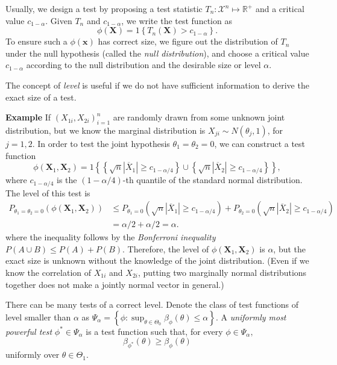 \documentclass[11pt]{article}
\begin{document}
\bigskip 

    Usually, we design a test by proposing a test statistic
\(T_{n}:\mathcal{X}^{n}\mapsto\mathbb{R}^{+}\) and a critical value
\(c_{1-\alpha}\). Given \(T_n\) and \(c_{1-\alpha}\), we write the test
function as
\[\phi\left(\mathbf{X}\right)=1\left\{ T_{n}\left(\mathbf{X}\right)>c_{1-\alpha}\right\}.\]
To ensure such a \(\phi\left(\mathbf{x}\right)\) has correct size, we
figure out the distribution of \(T_{n}\) under the null hypothesis
(called the \emph{null distribution}), and choose a critical value
\(c_{1-\alpha}\) according to the null distribution and the desirable
size or level \(\alpha\).

The concept of \emph{level} is useful if we do not have sufficient information to
derive the exact size of a test.

\bigskip

\textbf{Example} If \(\left(X_{1i},X_{2i}\right)_{i=1}^{n}\) are
randomly drawn from some unknown joint distribution, but we know the
marginal distribution is \(X_{ji}\sim N\left(\theta_{j},1\right)\), for
\(j=1,2\). In order to test the joint hypothesis
\(\theta_{1}=\theta_{2}=0\), we can construct a test function
\[\phi\left(\mathbf{X}_{1},\mathbf{X}_{2}\right)=1\left\{ \left\{ \sqrt{n}\left|\overline{X}_{1}\right|\geq c_{1-\alpha/4}\right\} \cup\left\{ \sqrt{n}\left|\overline{X}_{2}\right|\geq c_{1-\alpha/4}\right\} \right\} ,\]
where \(c_{1-\alpha/4}\) is the \(\left(1-\alpha/4\right)\)-th quantile
of the standard normal distribution. The level of this test is
\[\begin{aligned}
P_{\theta_{1}=\theta_{2}=0}\left(\phi\left(\mathbf{X}_{1},\mathbf{X}_{2}\right)\right) & \leq P_{\theta_{1}=0}\left(\sqrt{n}\left|\overline{X}_{1}\right|\geq c_{1-\alpha/4}\right)+P_{\theta_{2}=0}\left(\sqrt{n}\left|\overline{X}_{2}\right|\geq c_{1-\alpha/4}\right)\\
 & =\alpha/2+\alpha/2=\alpha.\end{aligned}\] where the inequality
follows by the \emph{Bonferroni inequality}
\(P\left(A\cup B\right)\leq P\left(A\right)+P\left(B\right)\).
Therefore, the level of
\(\phi\left(\mathbf{X}_{1},\mathbf{X}_{2}\right)\) is \(\alpha\), but
the exact size is unknown without the knowledge of the joint
distribution. (Even if we know the correlation of \(X_{1i}\) and
\(X_{2i}\), putting two marginally normal distributions together does
not make a jointly normal vector in general.)

\bigskip


    There can be many tests of a correct level. Denote the class of test
functions of level smaller than \(\alpha\) as
\(\Psi_{\alpha}=\left\{ \phi:\sup_{\theta\in\Theta_{0}}\beta_{\phi}\left(\theta\right)\leq\alpha\right\}\).
A \emph{uniformly most powerful test} \(\phi^{*}\in\Psi_{\alpha}\) is a
test function such that, for every \(\phi\in\Psi_{\alpha},\)
\[\beta_{\phi^{*}}\left(\theta\right)\geq\beta_{\phi}\left(\theta\right)\]
uniformly over \(\theta\in\Theta_{1}\).
\end{document}
